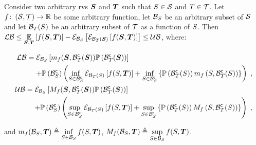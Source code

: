 \begin{proposition}
	\label{thm:bound_multi_cond}
	Consider two arbitrary \glspl{rv} $\RV$ and $\RVI$ such that $\variable\in\Space$ and $\variableI\in\SpaceI$. Let $f\colon\left(\Space,\SpaceI\right)\to\R$ be some arbitrary function, let $\subSpaceI{\variable}$ be an arbitrary subset of $\Space$ and let $\subSpaceI{\variableI}(\variable)$ be an arbitrary subset of $\SpaceI$ as a function of $\variable$. Then $\lowerbound\leq\expectation{f(\RV,\RVI)}{\RV,\RVI}-\partialexpectation{\partialexpectation{f(\RV,\RVI)}{\subSpaceI{\variableI}(\RV)}}{\subSpaceI{\variable}}\leq\upperbound$, where:
	\begin{small}
		\begin{subequations}
			\begin{align}
				\begin{split}
					\lowerbound & = \partialexpectation{m_f(\RV,\stcompI{\subSpace}{\variableI}(\RV))\measure{\stcompI{\subSpace}{\variableI}(\RV)}}{\subSpaceI{\variable}}
					\\
					& \phantomeq+\measure{\stcompI{\subSpace}{\variable}}\left(\inf_{\variable\in\stcompI{\subSpace}{\variable}}\partialexpectation{f(\variable,\RVI)}{\subSpaceI{\variableI}(\variable)}+\inf_{\variable\in\stcompI{\subSpace}{\variable}}\left\{\measure{\stcompI{\subSpace}{\variableI}(\variable)}m_f\left(\variable,\stcompI{\subSpace}{\variableI}(\variable)\right)\right\}\right)\;,
				\end{split}
				\\
				\begin{split}
					\upperbound & = \partialexpectation{M_f(\RV,\stcompI{\subSpace}{\variableI}(\RV))\measure{\stcompI{\subSpace}{\variableI}(\RV)}}{\subSpaceI{\variable}}
					\\
					& \phantomeq+\measure{\stcompI{\subSpace}{\variable}}\left(\sup_{\variable\in\stcompI{\subSpace}{\variable}}\partialexpectation{f(\variable,\RVI)}{\subSpaceI{\variableI}(\variable)}+\sup_{\variable\in\stcompI{\subSpace}{\variable}}\left\{\measure{\stcompI{\subSpace}{\variableI}(\variable)}M_f\left(\variable,\stcompI{\subSpace}{\variableI}(\variable)\right)\right\}\right)\;,
				\end{split}
			\end{align}
		\end{subequations}
	\end{small}
	and $m_f(\subSpaceI{\variable},\RVI)\triangleq\inf\limits_{\variable\in\subSpaceI{\variable}}f(\variable,\RVI)$, $M_f(\subSpaceI{\variable},\RVI)\triangleq\sup\limits_{\variable\in\subSpaceI{\variable}}f(\variable,\RVI)$.
\end{proposition}
